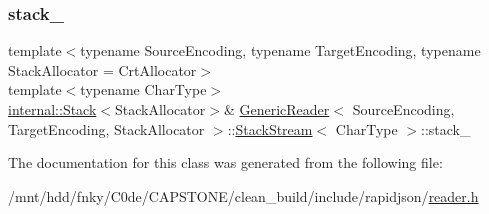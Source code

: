 \mbox{\label{classGenericReader_1_1StackStream_a175494011b48c130d092129fae81bcc8}} 
\subsubsection{\texorpdfstring{stack\+\_\+}{stack\_}}
{\footnotesize\ttfamily template$<$typename Source\+Encoding, typename Target\+Encoding, typename Stack\+Allocator = Crt\+Allocator$>$ \\
template$<$typename Char\+Type$>$ \\
\hyperlink{classinternal_1_1Stack}{internal\+::\+Stack}$<$Stack\+Allocator$>$\& \hyperlink{classGenericReader}{Generic\+Reader}$<$ Source\+Encoding, Target\+Encoding, Stack\+Allocator $>$\+::\hyperlink{classGenericReader_1_1StackStream}{Stack\+Stream}$<$ Char\+Type $>$\+::stack\+\_\+\hspace{0.3cm}{\ttfamily [private]}}



The documentation for this class was generated from the following file\+:\begin{DoxyCompactItemize}
\item 
/mnt/hdd/fnky/\+C0de/\+C\+A\+P\+S\+T\+O\+N\+E/clean\+\_\+build/include/rapidjson/\hyperlink{reader_8h}{reader.\+h}\end{DoxyCompactItemize}
